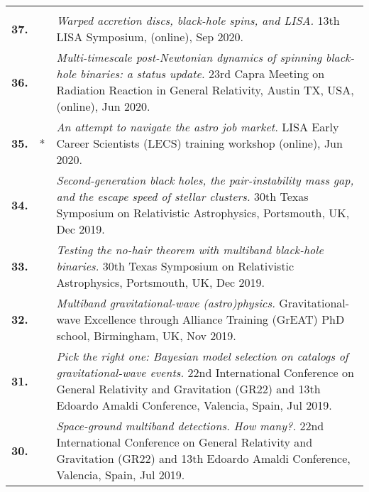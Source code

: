 {\begin{longtable}{rp{0.3cm}p{15.8cm}}
\vspace{0.05cm}\\
%
\textbf{37.} &  & \textit{Warped accretion discs, black-hole spins, and LISA.}
\newline{}
13th LISA Symposium, (online), Sep 2020.
\vspace{0.05cm}\\
%
\textbf{36.} &  & \textit{Multi-timescale post-Newtonian dynamics of spinning black-hole binaries: a status update.}
\newline{}
23rd Capra Meeting on Radiation Reaction in General Relativity, Austin TX, USA, (online), Jun 2020.
\vspace{0.05cm}\\
%
\textbf{35.} & * & \textit{An attempt to navigate the astro job market.}
\newline{}
LISA Early Career Scientists (LECS) training workshop (online), Jun 2020.
\vspace{0.05cm}\\
%
\textbf{34.} &  & \textit{Second-generation black holes, the pair-instability mass gap, and the escape speed of stellar clusters.}
\newline{}
30th Texas Symposium on Relativistic Astrophysics, Portsmouth, UK, Dec 2019.
\vspace{0.05cm}\\
%
\textbf{33.} &  & \textit{Testing the no-hair theorem with multiband black-hole binaries.}
\newline{}
30th Texas Symposium on Relativistic Astrophysics, Portsmouth, UK, Dec 2019.
\vspace{0.05cm}\\
%
\textbf{32.} &  & \textit{Multiband gravitational-wave (astro)physics.}
\newline{}
Gravitational-wave Excellence through Alliance Training (GrEAT) PhD school, Birmingham, UK, Nov 2019.
\vspace{0.05cm}\\
%
\textbf{31.} &  & \textit{Pick the right one: Bayesian model selection on catalogs of gravitational-wave events.}
\newline{}
22nd International Conference on General Relativity and Gravitation (GR22) and 13th Edoardo Amaldi Conference, Valencia, Spain, Jul 2019.
\vspace{0.05cm}\\
%
\textbf{30.} &  & \textit{Space-ground multiband detections. How many?.}
\newline{}
22nd International Conference on General Relativity and Gravitation (GR22) and 13th Edoardo Amaldi Conference, Valencia, Spain, Jul 2019.

\end{longtable}}
